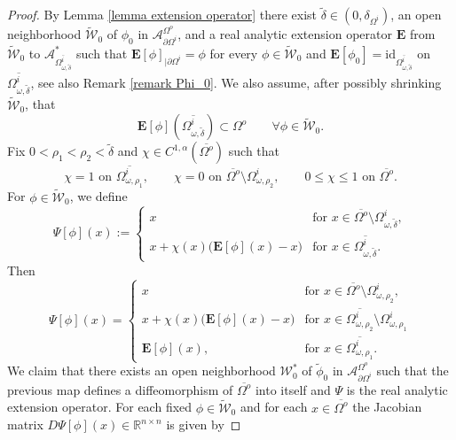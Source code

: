 \documentclass[11pt,reqno,a4paper]{amsart}
\theoremstyle{plain}
\theoremstyle{definition}
\newcommand{\R}{\mathbb{R}}
\begin{document}
\begin{proof}
    By Lemma \ref{lemma extension operator} there exist $\tilde{\delta}\in(0,\delta_{\Omega^i})$, an open neighborhood $\tilde{\mathcal{W}}_0$ of $\phi_0$ in $\mathcal{A}^{\Omega^o}_{\partial\Omega^i}$, and a real analytic extension operator $\mathbf{E}$ from $\tilde{\mathcal{W}}_0$ to $\mathcal{A}^\ast_{\overline{\Omega^i_{\omega,\tilde{\delta}}}}$ such that $\mathbf{E}[\phi]_{|\partial\Omega^i}=\phi$ for every $\phi\in\tilde{\mathcal{W}}_0$ and $\mathbf{E}[\phi_0]=\mathrm{id}_{\overline{\Omega^i_{\omega,\tilde{\delta}}}}$ on $\overline{\Omega^i_{\omega,\tilde{\delta}}}$, see also Remark \ref{remark Phi_0}. We also assume, after possibly shrinking $\tilde{\mathcal{W}}_0$, that
    \[
        \mathbf{E}[\phi](\overline{\Omega^i_{\omega,\tilde{\delta}}})\subset \Omega^o
        \qquad \forall \phi\in\tilde{\mathcal{W}}_0.
    \]
    Fix $0<\rho_1<\rho_2<\tilde\delta$ and $\chi\in C^{1,\alpha}(\overline{\Omega^o})$ such that
    \[
    \chi=1 \text{ on } \overline{\Omega^i_{\omega,\rho_1}},
    \qquad
    \chi=0 \text{ on } \overline{\Omega^o}\setminus \Omega^i_{\omega,\rho_2},
    \qquad
    0\leq\chi\leq 1 \text{ on } \overline{\Omega^o}.
    \]
    For $\phi\in\tilde{\mathcal{W}}_0$, we define
    \begin{equation*}
        \Psi[\phi](x) :=
        \begin{cases}
        x & \text{for } x\in \overline{\Omega^o}\setminus\Omega^i_{\omega,\tilde\delta},\\
        x+\chi(x)\bigl(\mathbf{E}[\phi](x)-x\bigr) & \text{for } x\in \overline{\Omega^i_{\omega,\tilde\delta}}.
        \end{cases}
    \end{equation*}
    Then
    \begin{equation}\label{eq Psi phi 2}
        \Psi[\phi](x)=
        \begin{cases}
        x & \text{for } x\in \overline{\Omega^o}\setminus\Omega^i_{\omega,\rho_2},\\
        x+\chi(x)\bigl(\mathbf{E}[\phi](x)-x\bigr) & \text{for } x\in \overline{\Omega^i_{\omega,\rho_2}}\setminus \Omega^i_{\omega,\rho_1}\\
        \mathbf{E}[\phi](x), & \text{for } x\in \overline{\Omega^i_{\omega,\rho_1}}.
        \end{cases}
    \end{equation}
    We claim that there exists an open neighborhood $\mathcal{W}^\ast_0$ of $\tilde{\phi}_0$ in $\mathcal{A}^{\Omega^o}_{\partial\Omega^i}$ such that the previous map defines a diffeomorphism of $\overline{\Omega^o}$ into itself and $\Psi$ is the real analytic extension operator. For each fixed $\phi \in \tilde{\mathcal{W}}_0$ and for each $x\in \overline{\Omega^o}$ the Jacobian matrix $D\Psi[\phi](x) \in \R^{n\times n}$ is given by

\end{proof}
\end{document}
